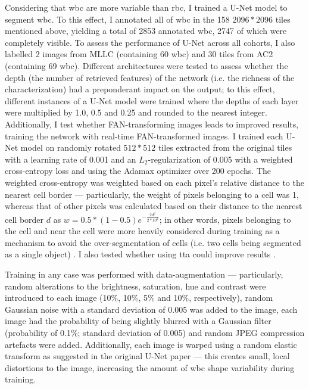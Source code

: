 Considering that \ac{wbc} are more variable than \ac{rbc}, I trained a U-Net model \cite{Ronneberger2015-do} to segment \ac{wbc}. To this effect, I annotated all of \ac{wbc} in the 158 $2096*2096$ tiles mentioned above, yielding a total of 2853 annotated \ac{wbc}, 2747 of which were completely visible. To assess the performance of U-Net across all cohorts, I also labelled 2 images from MLLC (containing 60 \ac{wbc}) and 30 tiles from AC2 (containing 69 \ac{wbc}). Different architectures were tested to assess whether the depth (the number of retrieved features) of the network (i.e. the richness of the characterization) had a preponderant impact on the output; to this effect, different instances of a U-Net model were trained where the depths of each layer were multiplied by 1.0, 0.5 and 0.25 and rounded to the nearest integer. Additionally, I test whether FAN-transforming images leads to improved results, training the network with real-time FAN-transformed images. I trained each U-Net model on randomly rotated $512*512$ tiles extracted from the original tiles with a learning rate of 0.001 and an $L_2$-regularization of 0.005 with a weighted cross-entropy loss and using the Adamax optimizer \cite{Kingma2014-zd} over 200 epochs. The weighted cross-entropy was weighted based on each pixel's relative distance to the nearest cell border --- particularly, the weight of pixels belonging to a cell was 1, whereas that of other pixels was calculated based on their distance to the nearest cell border $d$ as $w = 0.5 * (1-0.5)e^{-\frac{2d^2}{2*10^2}}$; in other words, pixels belonging to the cell and near the cell were more heavily considered during training as a mechanism to avoid the over-segmentation of cells (i.e. two cells being segmented as a single object) \cite{Ronneberger2015-do}. I also tested whether using \ac{tta} could improve results \cite{Moshkov2020-rc}. 

Training in any case was performed with data-augmentation --- particularly, random alterations to the brightness, saturation, hue and contrast were introduced to each image (10\%, 10\%, 5\% and 10\%, respectively), random Gaussian noise with a standard deviation of 0.005 was added to the image, each image had the probability of being slightly blurred with a Gaussian filter (probability of 0.1\%; standard deviation of 0.005) and random JPEG compression artefacts were added. Additionally, each image is warped using a random elastic transform as suggested in the original U-Net paper \cite{Ronneberger2015-do} --- this creates small, local distortions to the image, increasing the amount of \ac{wbc} shape variability during training. 

